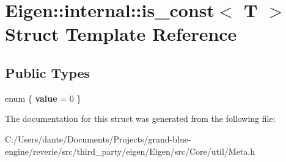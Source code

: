 \hypertarget{struct_eigen_1_1internal_1_1is__const}{}\section{Eigen\+::internal\+::is\+\_\+const$<$ T $>$ Struct Template Reference}
\label{struct_eigen_1_1internal_1_1is__const}
\subsection*{Public Types}
\begin{DoxyCompactItemize}
\item 
\mbox{\label{struct_eigen_1_1internal_1_1is__const_ab8a14c86bd813586c51598158e79dd24}} 
enum \{ {\bfseries value} = 0
 \}
\end{DoxyCompactItemize}


The documentation for this struct was generated from the following file\+:\begin{DoxyCompactItemize}
\item 
C\+:/\+Users/dante/\+Documents/\+Projects/grand-\/blue-\/engine/reverie/src/third\+\_\+party/eigen/\+Eigen/src/\+Core/util/Meta.\+h\end{DoxyCompactItemize}
